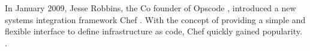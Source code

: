In January 2009, Jesse Robbins, the Co founder of Opscode \cite{mittechreviewrobbins}, introduced a new systems integration framework Chef \cite{chefcomannouncement}. With the concept of providing a simple and flexible interface to define infrastructure as code, Chef quickly gained popularity.  \cite{pandey2012investigating}.
